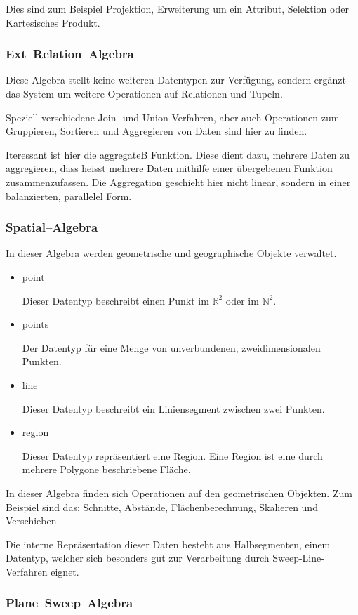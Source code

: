 Dies sind zum Beispiel Projektion, Erweiterung um ein Attribut, Selektion oder Kartesisches Produkt.

\subsubsection{Ext--Relation--Algebra}

Diese Algebra stellt keine weiteren Datentypen zur Verfügung, sondern ergänzt das System um weitere Operationen auf Relationen und Tupeln. 

Speziell verschiedene Join- und Union-Verfahren, aber auch Operationen zum Gruppieren, Sortieren und Aggregieren von Daten sind hier zu finden.

Iteressant ist hier die aggregateB Funktion. Diese dient dazu, mehrere Daten zu aggregieren, dass heisst mehrere Daten mithilfe einer übergebenen Funktion zusammenzufassen. Die Aggregation geschieht hier nicht linear, sondern in einer balanzierten, parallelel Form. 

\subsubsection{Spatial--Algebra}
In dieser Algebra werden geometrische und geographische Objekte verwaltet.
\begin{itemize}
\item point

Dieser Datentyp beschreibt einen Punkt im $\mathbb{R}^2$ oder im $\mathbb{N}^2$.
\item points

Der Datentyp für eine Menge von unverbundenen, zweidimensionalen Punkten. 
\item line

Dieser Datentyp beschreibt ein Liniensegment zwischen zwei Punkten.
\item region

Dieser Datentyp repräsentiert eine Region. Eine Region ist eine durch mehrere Polygone beschriebene Fläche.
\end{itemize}

In dieser Algebra finden sich Operationen auf den geometrischen Objekten. Zum Beispiel sind das:
 Schnitte, Abstände, Flächenberechnung, Skalieren und Verschieben.
 
Die interne Repräsentation dieser Daten besteht aus Halbsegmenten, einem Datentyp, welcher sich besonders gut zur Verarbeitung durch Sweep-Line-Verfahren eignet.

\subsubsection{Plane--Sweep--Algebra}

